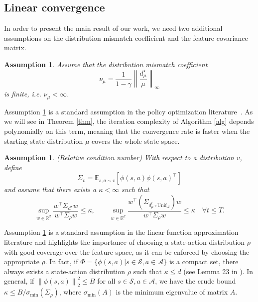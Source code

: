 \documentclass[a4paper,12pt]{article}
\newtheorem{assumption}[theorem]{Assumption}
\numberwithin{theorem}{section}
\newcommand\E{\mathbb{E}}
\newcommand\A{\mathcal{A}}
\newcommand\R{\mathbb{R}}
\renewcommand\S{\mathcal{S}}
\newcommand\1{\mathbf{1}}
\newcommand{\norm}[1]{\left\lVert #1 \right\rVert}
\begin{document}
\subsection{Linear convergence}
\label{sub:thm}
In order to present the main result of our work, we need two additional assumptions on the distribution mismatch coefficient and the feature covariance matrix.
\begin{assumption}
	\label{ass:mismatch}
	Assume that the distribution mismatch coefficient \[\nu_\mu = \frac{1}{1-\gamma}\norm{\frac{d^\star_\mu}{\mu}}_\infty\]
	is finite, i.e. $\nu_\mu<\infty$.
\end{assumption}
Assumption \ref{ass:mismatch} is a standard assumption in the policy optimization literature~\citep{RN265,RN266}. As we will see in Theorem \ref{thm}, the iteration complexity of Algorithm \ref{alg} depends polynomially on this term, meaning that the convergence rate is faster when the starting state distribution $\mu$ covers the whole state space.
\begin{assumption} (Relative condition number)
	\label{ass:cond}
	With respect to a distribution $v$, define \[\Sigma_v = \E_{s,a\sim v}\left[\phi(s,a)\phi(s,a)^\top\right]\]
	and assume that there exists a $\kappa<\infty$ such that \[\sup_{w\in\R^d}\frac{w^\top\Sigma_{d^\star}w}{w^\top\Sigma_{\rho}w}\leq\kappa,\qquad\sup_{w\in\R^d}\frac{w^\top(\Sigma_{d^t_\mu\circ\text{Unif}_\A})w}{w^\top\Sigma_{\rho}w}\leq\kappa\quad\forall t\leq T.\]
\end{assumption}
Assumption \ref{ass:cond} is a standard assumption in the linear function approximation literature and highlights the importance of choosing a state-action distribution $\rho$ with good coverage over the feature space, as it can be enforced by choosing the appropriate $\rho$. In fact, if $\Phi = \{\phi(s,a)|s\in\S,a\in\A\}$ is a compact set, there always exists a state-action distribution $\rho$ such that $\kappa\leq d$ (see Lemma 23 in \cite{RN265}). In general, if $\norm{\phi(s,a)}_2^2\leq B$ for all $s\in\S,a\in\A$, we have the crude bound $\kappa\leq B/\sigma_\text{min}(\Sigma_{\rho})$, where $\sigma_\text{min}(A)$ is the minimum eigenvalue of matrix $A$.
\end{document}
